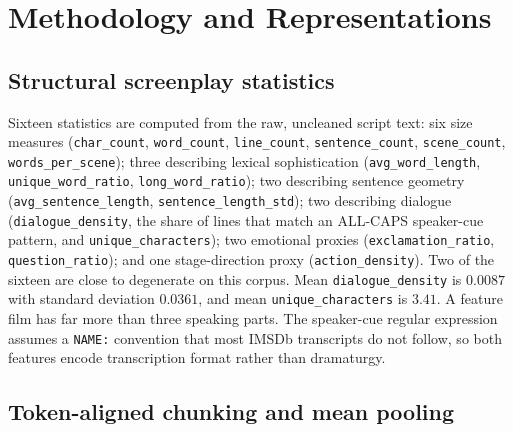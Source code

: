 \documentclass[conference,a4paper]{IEEEtran}
\begin{document}
\section{Methodology and Representations}
\label{sec:method}

\subsection{Structural screenplay statistics}

Sixteen statistics are computed from the raw, uncleaned script text: six
size measures (\texttt{char\_count}, \texttt{word\_count},
\texttt{line\_count}, \texttt{sentence\_count}, \texttt{scene\_count},
\texttt{words\_per\_scene}); three describing lexical sophistication
(\texttt{avg\_word\_length}, \texttt{unique\_word\_ratio},
\texttt{long\_word\_ratio}); two describing sentence geometry
(\texttt{avg\_sentence\_length}, \texttt{sentence\_length\_std}); two
describing dialogue (\texttt{dialogue\_density}, the share of lines that
match an ALL-CAPS speaker-cue pattern, and \texttt{unique\_characters});
two emotional proxies (\texttt{exclamation\_ratio},
\texttt{question\_ratio}); and one stage-direction proxy
(\texttt{action\_density}). Two of the sixteen are close to degenerate on
this corpus. Mean \texttt{dialogue\_density} is $0.0087$ with standard
deviation $0.0361$, and mean \texttt{unique\_characters} is $3.41$. A
feature film has far more than three speaking parts. The speaker-cue
regular expression assumes a \texttt{NAME:} convention that most IMSDb
transcripts do not follow, so both features encode transcription format
rather than dramaturgy.

\subsection{Token-aligned chunking and mean pooling}
\label{sec:tokens}
\end{document}
